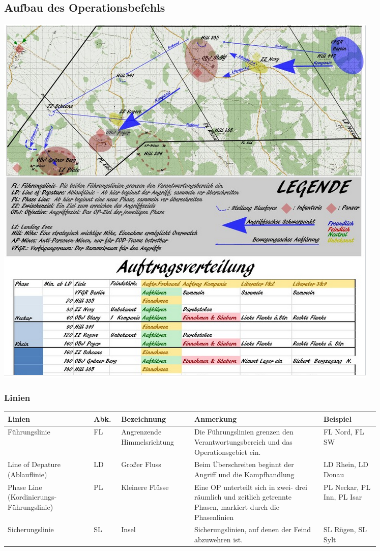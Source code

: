 \newpage
\subsection{Aufbau des Operationsbefehls}
\label{OPbef}

\begin{minipage}[t]{1\textwidth}
	\includegraphics[width=\textwidth]{./img/fortgeschrittenes/karteUndMarkierungen/OP-Befehl.png}
\end{minipage}

\subsubsection{Linien}
\begin{longtable}{|p{0.2\linewidth}|p{0.05\linewidth}|p{0.17\linewidth}|p{0.3\linewidth}|p{0.13\linewidth}|} 	
	\hline
	Linien	&	Abk.	&	Bezeichnung		&	Anmerkung 	&	Beispiel \\ 
	\hline
	Führungslinie	&	FL	&	Angrenzende Himmelsrichtung	&	Die Führungslinien grenzen  den Verantwortungsbereich und das Operationsgebiet ein. & FL Nord, FL SW \\ 
	\hline
	Line of Depature (Ablauflinie)	&	LD	&	Großer Fluss	&	Beim Überschreiten beginnt der Angriff und die Kampfhandlung 	&	LD Rhein, LD Donau	\\ 
	\hline
	Phase Line (Kordinierungs-Führungslinie) & PL	&	Kleinere Flüsse	&	Eine OP unterteilt sich in zwei- drei räumlich und zeitlich getrennte Phasen, markiert durch die Phasenlinien	& PL Neckar, PL Inn, PL Isar	\\ 
	\hline
	Sicherungslinie 	&	SL 	&	Insel	&	Sicherungslinien, auf denen der Feind abzuwehren ist.	&	SL Rügen, SL Sylt	\\ 
	\hline
\end{longtable}

